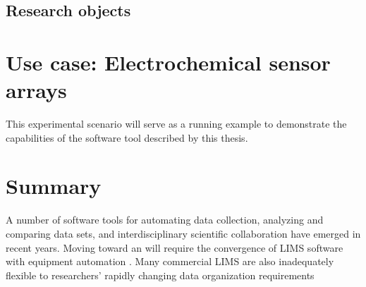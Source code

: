 \subsection{Research objects}




\section{Use case: Electrochemical sensor arrays}

This experimental scenario will serve as a running example to
demonstrate the capabilities of the software tool described by this thesis.



\section{Summary}

A number of software tools for automating data collection, analyzing
and comparing data sets, and interdisciplinary scientific
collaboration have emerged in recent years. Moving toward an    will
require the convergence of LIMS software with equipment automation .
Many commercial LIMS are also inadequately flexible to researchers'
rapidly changing data organization requirements